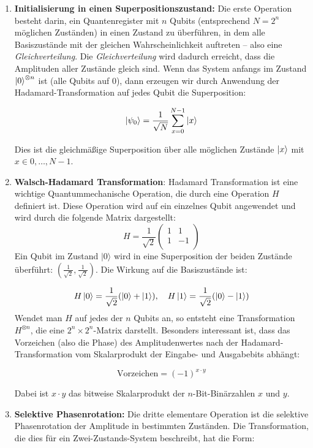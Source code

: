 \begin{enumerate}
    \item \textbf{Initialisierung in einen Superpositionszustand:} 
    Die erste Operation besteht darin, ein Quantenregister mit $n$ Qubits (entsprechend $N = 2^{n}$ möglichen Zuständen) in einen Zustand zu überführen, in dem alle Basiszustände mit der gleichen Wahrscheinlichkeit auftreten – also eine \textit{Gleichverteilung}. Die \textit{Gleichverteilung} wird dadurch erreicht, dass die Amplituden aller Zustände gleich sind. Wenn das System anfangs im Zustand $\ket{0}^{\otimes n}$ ist (alle Qubits auf 0), dann erzeugen wir durch Anwendung der Hadamard-Transformation auf jedes Qubit die Superposition:

$$
\ket{\psi_0} = \frac{1}{\sqrt{N}} \sum_{x=0}^{N-1} \ket{x}
$$

Dies ist die gleichmäßige Superposition über alle möglichen Zustände $\ket{x}$ mit $x \in {0, \ldots, N-1}$.\\
    \item \textbf{Walsch-Hadamard Transformation}: Hadamard Transformation ist eine wichtige Quantummechanische Operation, die durch eine Operation $H$ definiert ist. Diese Operation wird auf ein einzelnes Qubit angewendet und wird durch die folgende Matrix dargestellt:
    $$
H = \frac{1}{\sqrt{2}} \begin{pmatrix}
1 & 1 \\
1 & -1 \\
\end{pmatrix}
$$
Ein Qubit im Zustand \( \lvert 0 \rangle \) wird in eine Superposition der beiden Zustände überführt: \( \left( \frac{1}{\sqrt{2}}, \frac{1}{\sqrt{2}} \right) \). Die Wirkung auf die Basiszustände ist:

$$
H\ket{0} = \frac{1}{\sqrt{2}}(\ket{0} + \ket{1}), \quad H\ket{1} = \frac{1}{\sqrt{2}}(\ket{0} - \ket{1})
$$
Wendet man $H$ auf jedes der $n$ Qubits an, so entsteht eine Transformation $H^{\otimes n}$, die eine $2^n \times 2^n$-Matrix darstellt.
Besonders interessant ist, dass das Vorzeichen (also die Phase) des Amplitudenwertes nach der Hadamard-Transformation vom Skalarprodukt der Eingabe- und Ausgabebits abhängt:

$$
\text{Vorzeichen} = (-1)^{x \cdot y}
$$

Dabei ist $x \cdot y$ das bitweise Skalarprodukt der $n$-Bit-Binärzahlen $x$ und $y$.\\

    \item \textbf{Selektive Phasenrotation:} Die dritte elementare Operation ist die selektive Phasenrotation der Amplitude in bestimmten Zuständen. Die Transformation, die dies für ein Zwei-Zustands-System beschreibt, hat die Form:


\end{enumerate}
